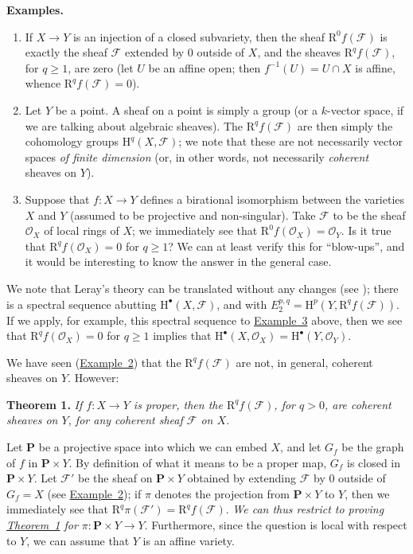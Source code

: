 \documentclass{article}
\newenvironment{itenv}[1]
  {\phantomsection\par\medskip\noindent\textbf{#1.}\itshape}
  {\medskip}
\newenvironment{rmenv}[1]
  {\phantomsection\par\medskip\noindent\textbf{#1.}\rmfamily}
  {\medskip}
\newcommand{\scr}[1]{{\mathscr{#1}}}
\newcommand{\HH}{\mathrm{H}}
\newcommand{\RR}{\mathrm{R}}
\newcommand{\PP}{\mathbf{P}}
\renewcommand{\geq}{\geqslant}
\newcommand{\oldpage}[1]{\marginpar{\footnotesize$\Big\vert$ \textit{p.~#1}}}
\begin{document}
\begin{rmenv}{Examples}
  \phantom{.}
  \begin{enumerate}
    \item If $X\to Y$ is an injection of a closed subvariety, then the sheaf $\RR^0f(\scr{F})$ is exactly the sheaf $\scr{F}$ extended by $0$ outside of $X$, and the sheaves $\RR^qf(\scr{F})$, for $q\geq1$, are zero (let $U$ be an affine open; then $f^{-1}(U)=U\cap X$ is affine, whence $\RR^qf(\scr{F})=0$).
      \label{example1}
    \item Let $Y$ be a point.
      A sheaf on a point is simply a group (or a $k$-vector space, if we are talking about algebraic sheaves).
      The $\RR^qf(\scr{F})$ are then simply the cohomology groups $\HH^q(X,\scr{F})$;
      we note that these are not necessarily vector spaces \emph{of finite dimension} (or, in other words, not necessarily \emph{coherent} sheaves on $Y$).
        \label{example2}
    \item Suppose that $f\colon X\to Y$ defines a birational isomorphism between the varieties $X$ and $Y$ (assumed to be projective and non-singular).
      Take $\scr{F}$ to be the sheaf $\scr{O}_X$ of local rings of $X$;
      we immediately see that $\RR^0f(\scr{O}_X)=\scr{O}_Y$.
      Is it true that $\RR^qf(\scr{O}_X)=0$ for $q\geq1$?
      We can at least verify this for ``blow-ups'', and it would be interesting to know the answer in the general case.
      \label{example3}
  \end{enumerate}
\end{rmenv}

We note that Leray's theory can be translated without any changes (see \cite{7});
there is a spectral sequence abutting $\HH^\bullet(X,\scr{F})$, and with $E_2^{p,q}=\HH^p(Y,\RR^qf(\scr{F}))$.
If we apply, for example, this spectral sequence
\oldpage{103}
to \hyperref[example3]{Example~3} above, then we see that $\RR^qf(\scr{O}_X)=0$ for $q\geq1$ implies that $\HH^\bullet(X,\scr{O}_X)=\HH^\bullet(Y,\scr{O}_Y)$.

We have seen (\hyperref[example2]{Example~2}) that the $\RR^qf(\scr{F})$ are not, in general, coherent sheaves on $Y$.
However:

\begin{itenv}{Theorem 1}
\label{theorem1}
  If $f\colon X\to Y$ is proper, then the $\RR^qf(\scr{F})$, for $q>0$, are coherent sheaves on $Y$, for any coherent sheaf $\scr{F}$ on $X$.
\end{itenv}

Let $\PP$ be a projective space into which we can embed $X$, and let $G_f$ be the graph of $f$ in $\PP\times Y$.
By definition of what it means to be a proper map, $G_f$ is closed in $\PP\times Y$.
Let $\scr{F}'$ be the sheaf on $\PP\times Y$ obtained by extending $\scr{F}$ by $0$ outside of $G_f=X$ (see \hyperref[example2]{Example~2});
if $\pi$ denotes the projection from $\PP\times Y$ to $Y$, then we immediately see that $\RR^q\pi(\scr{F}')=\RR^qf(\scr{F})$.
\emph{We can thus restrict to proving \hyperref[theorem1]{Theorem~1} for $\pi\colon \PP\times Y\to Y$}.
Furthermore, since the question is local with respect to $Y$, we can assume that $Y$ is an affine variety.
\end{document}
